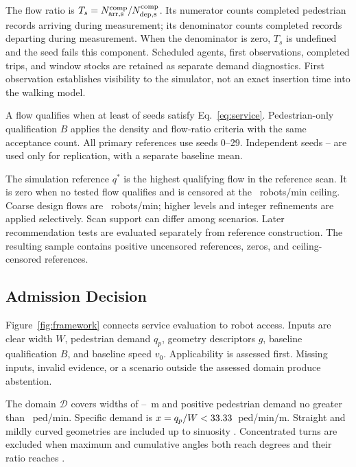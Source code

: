 \documentclass[NewProceedings,letterpaper]{ascelike-new}
\begin{document}
The flow ratio is $T_s=N_{\rm arr,s}^{\rm comp}/N_{\rm dep,s}^{\rm comp}$. Its numerator counts completed pedestrian records arriving during measurement; its denominator counts completed records departing during measurement. When the denominator is zero, $T_s$ is undefined and the seed fails this component. Scheduled agents, first observations, completed trips, and window stocks are retained as separate demand diagnostics. First observation establishes visibility to the simulator, not an exact insertion time into the walking model.

A flow qualifies when at least \PassN{} of \SeedN{} seeds satisfy Eq.~\ref{eq:service}. Pedestrian-only qualification $B$ applies the density and flow-ratio criteria with the same acceptance count. All primary references use seeds 0--29. Independent seeds \IndependentSeedStart{}--\IndependentSeedEnd{} are used only for replication, with a separate baseline mean.

The simulation reference $q^*$ is the highest qualifying flow in the reference scan. It is zero when no tested flow qualifies and is censored at the \QMax{}~robots/min ceiling. Coarse design flows are \FlowGrid{}~robots/min; higher levels and integer refinements are applied selectively. Scan support can differ among scenarios. Later recommendation tests are evaluated separately from reference construction. The resulting sample contains \PositiveReferences{} positive uncensored references, \ZeroReferences{} zeros, and \CensoredReferences{} ceiling-censored references.

\subsection{Admission Decision}
Figure~\ref{fig:framework} connects service evaluation to robot access. Inputs are clear width $W$, pedestrian demand $q_p$, geometry descriptors $g$, baseline qualification $B$, and baseline speed $v_0$. Applicability is assessed first. Missing inputs, invalid evidence, or a scenario outside the assessed domain produce abstention.

The domain $\mathcal D$ covers widths of \WidthMin{}--\WidthMax{}~m and positive pedestrian demand no greater than \DemandMax{}~ped/min. Specific demand is $x=q_p/W<33.33{}$~ped/min/m. Straight and mildly curved geometries are included up to sinuosity \SinuosityMax{}. Concentrated turns are excluded when maximum and cumulative angles both reach \TurnAngle{} degrees and their ratio reaches \TurnRatio{}.
\end{document}
